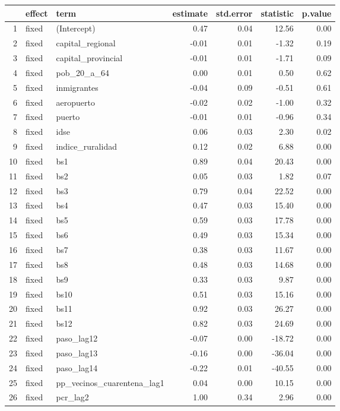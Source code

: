 \begin{table}[ht]
\centering
\begin{tabular}{rllrrrr}
  \hline
 & effect & term & estimate & std.error & statistic & p.value \\ 
  \hline
1 & fixed & (Intercept) & 0.47 & 0.04 & 12.56 & 0.00 \\ 
  2 & fixed & capital\_regional & -0.01 & 0.01 & -1.32 & 0.19 \\ 
  3 & fixed & capital\_provincial & -0.01 & 0.01 & -1.71 & 0.09 \\ 
  4 & fixed & pob\_20\_a\_64 & 0.00 & 0.01 & 0.50 & 0.62 \\ 
  5 & fixed & inmigrantes & -0.04 & 0.09 & -0.51 & 0.61 \\ 
  6 & fixed & aeropuerto & -0.02 & 0.02 & -1.00 & 0.32 \\ 
  7 & fixed & puerto & -0.01 & 0.01 & -0.96 & 0.34 \\ 
  8 & fixed & idse & 0.06 & 0.03 & 2.30 & 0.02 \\ 
  9 & fixed & indice\_ruralidad & 0.12 & 0.02 & 6.88 & 0.00 \\ 
  10 & fixed & bs1 & 0.89 & 0.04 & 20.43 & 0.00 \\ 
  11 & fixed & bs2 & 0.05 & 0.03 & 1.82 & 0.07 \\ 
  12 & fixed & bs3 & 0.79 & 0.04 & 22.52 & 0.00 \\ 
  13 & fixed & bs4 & 0.47 & 0.03 & 15.40 & 0.00 \\ 
  14 & fixed & bs5 & 0.59 & 0.03 & 17.78 & 0.00 \\ 
  15 & fixed & bs6 & 0.49 & 0.03 & 15.34 & 0.00 \\ 
  16 & fixed & bs7 & 0.38 & 0.03 & 11.67 & 0.00 \\ 
  17 & fixed & bs8 & 0.48 & 0.03 & 14.68 & 0.00 \\ 
  18 & fixed & bs9 & 0.33 & 0.03 & 9.87 & 0.00 \\ 
  19 & fixed & bs10 & 0.51 & 0.03 & 15.16 & 0.00 \\ 
  20 & fixed & bs11 & 0.92 & 0.03 & 26.27 & 0.00 \\ 
  21 & fixed & bs12 & 0.82 & 0.03 & 24.69 & 0.00 \\ 
  22 & fixed & paso\_lag12 & -0.07 & 0.00 & -18.72 & 0.00 \\ 
  23 & fixed & paso\_lag13 & -0.16 & 0.00 & -36.04 & 0.00 \\ 
  24 & fixed & paso\_lag14 & -0.22 & 0.01 & -40.55 & 0.00 \\ 
  25 & fixed & pp\_vecinos\_cuarentena\_lag1 & 0.04 & 0.00 & 10.15 & 0.00 \\ 
  26 & fixed & pcr\_lag2 & 1.00 & 0.34 & 2.96 & 0.00 \\ 
   \hline
\end{tabular}
\end{table}
